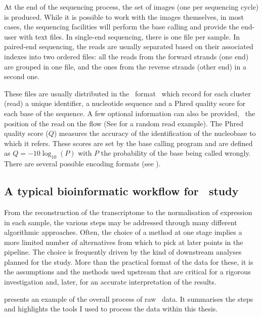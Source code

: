 At the end of the sequencing process, the set of images (one per sequencing cycle)
is produced. While it is possible to work with the images themselves, in most
cases, the sequencing facilities will perform the base calling and provide the
end-user with text files. In single-end sequencing, there is one file per sample.
In paired-end sequencing, the reads are usually separated based on their associated
indexes into two ordered files: all the reads from the forward strands (one end)
are grouped in one file, and the ones from the reverse strands (other end)
in a second one.\mybr\

These files are usually distributed in the \fastq\ format~
which record for each cluster (read) a unique identifier,
a nucleotide sequence and a \gls{Phred} quality score for each base of the
sequence. A few optional information can also be provided, \eg\
the position of the read on the \gls{flow} (See  for
a random read example).
The \gls{Phred} quality score ($Q$) measures the accuracy of the identification
of the nucleobase to which it refers. These scores are set by the base calling
program and are defined as $Q = -10\log_{10}(P)$ with $P$ the probability of
the base being called wrongly. There are several possible encoding formats
(see \Cref{sec:PhredScore}).\mybr\

\subsection{A typical bioinformatic workflow for \Rnaseq\ study\quad}\label{sub:RNAseqworflow}

From the reconstruction of the
transcriptome to the normalisation of expression in each sample, the various
steps may be addressed through many different algorithmic approaches.
Often, the choice of a method at one stage implies a more limited number of
alternatives from which to pick at later points in the pipeline.
The choice is frequently driven by the kind of downstream analyses planned for
the study. More than the practical format of the data for these, it is the
assumptions and the methods used upstream that are critical for a
rigorous investigation and, later, for an accurate interpretation of the results.\mybr\

 presents an example of the overall 
process of raw \Rnaseq\ data. It summarises the steps and highlights the tools
I used to process the data within this thesis.\mybr\

